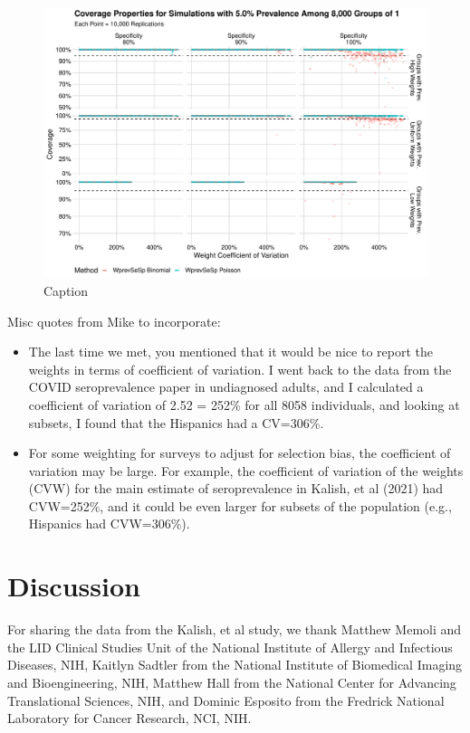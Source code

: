 \documentclass[AMA,STIX1COL]{WileyNJD-v2}
\begin{document}
\begin{figure}
    \centering
    \includegraphics[width=\textwidth]{figures/imperfect_coverage_8000_0_05_reduced.pdf}
    \caption{Caption}
    \label{fig:imperfect_coverage_8000_0_05_reduced.pdf}
\end{figure}




Misc quotes from Mike to incorporate:

\begin{itemize}
    \item The last time we met, you mentioned that it would be nice to report the weights in terms of coefficient of variation. I went back to the data from the COVID seroprevalence paper in undiagnosed adults, and I calculated a coefficient of variation  of 2.52 = 252\% for all 8058 individuals, and looking at subsets, I found that the Hispanics had a CV=306\%.  
    \item For some weighting for surveys to adjust for selection bias, the coefficient of variation may be large.  For example, the coefficient of variation of the weights (CVW) for the main estimate of seroprevalence in Kalish, et al (2021) had CVW=252\%, and it could be even larger for subsets of the population (e.g., Hispanics had CVW=306\%). 
\end{itemize}



\section{Discussion}

\acks
\begin{acks}
For sharing the data from the Kalish, et al study, we thank Matthew Memoli and the LID Clinical Studies Unit of the National Institute of Allergy and Infectious Diseases, NIH,  Kaitlyn Sadtler from the National Institute of Biomedical Imaging and Bioengineering, NIH,   Matthew Hall from the National Center for Advancing Translational Sciences, NIH, and Dominic Esposito from the Fredrick National Laboratory for Cancer Research, NCI, NIH.
\end{acks}
\end{document}
